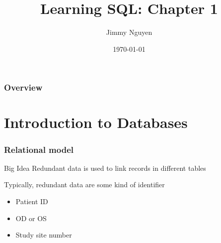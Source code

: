 \documentclass{beamer}
\title[Chapter 1]{Learning SQL: Chapter 1 } %
\author{Jimmy Nguyen} %
\institute[UCSF] %
{
Francis I. Proctor Foundation \\ %
\medskip
\textit{hieu.nguyen@ucsf.edu} %
}
\date{\today} %
\begin{document}

\begin{frame}
\titlepage %
\end{frame}

\begin{frame}
\frametitle{Overview} %
\tableofcontents %
\end{frame}



\section{Introduction to Databases}

\begin{frame}
\frametitle{Relational model}
\begin{block}{Big Idea}
	Redundant data is used to link records in different tables
\end{block}

Typically, redundant data are some kind of identifier
\begin{itemize}
	\item Patient ID
	\item OD or OS
	\item Study site number
\end{itemize}
\end{frame}
\end{document}
